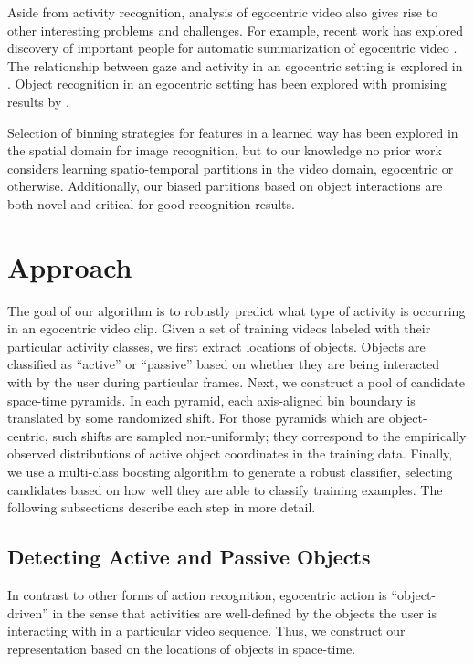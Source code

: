 \documentclass[12pt]{article} %
\begin{document}
  Aside from activity recognition, analysis of egocentric video also gives rise
  to other interesting problems and challenges.
  For example, recent work has explored discovery of important people for
  automatic summarization of egocentric
  video \cite{Lee12}. The relationship between gaze and activity in an
  egocentric setting is explored in \cite{Fathi12}.
  Object recognition in an egocentric setting has been
  explored with promising results by \cite{Ramanan12, Fathi11, ren-gu-cvpr2010}.


  Selection of binning strategies for features in a learned way has been explored in the
  spatial domain \cite{Sharma11, Jiang12} for image recognition,
  but to
  our knowledge no prior work considers learning spatio-temporal partitions
  in the video domain, egocentric or otherwise. Additionally, our biased partitions based on 
  object interactions are both novel and critical for good recognition results.
	
  

\section{Approach}
  The goal of our algorithm is to robustly predict what type of activity is occurring in
  an egocentric video clip. 
  Given a set of training videos labeled with their particular activity classes,
  we first extract locations of objects. Objects are classified as
  ``active'' or ``passive'' based on whether they are being interacted with by
  the user during particular frames. Next, we construct a pool of candidate
  space-time pyramids. In each pyramid, each axis-aligned bin boundary is
  translated by some randomized shift. For those pyramids which are
  object-centric, such shifts are sampled non-uniformly; they correspond to the
  empirically observed distributions of active object coordinates in the training
  data. Finally, we use a multi-class boosting algorithm to generate a robust
  classifier, selecting candidates based on how well they are able to classify
  training examples. The following subsections describe each step in more detail.
  
  
 







  \subsection{Detecting Active and Passive Objects}
  In contrast to other forms of action
  recognition, egocentric action is ``object-driven'' in the sense that
  activities are well-defined by the objects the user is interacting with in
  a particular video sequence.  
  Thus, we construct our representation based on the locations of objects in
  space-time.
\end{document}
